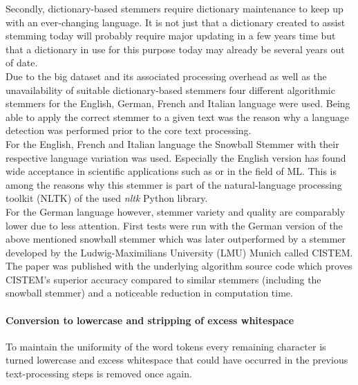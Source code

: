 Secondly, dictionary-based stemmers require dictionary maintenance to keep up with an ever-changing language. It is not just that a dictionary created to assist stemming today will probably require major updating in a few years time but that a dictionary in use for this purpose today may already be several years out of date.\\
Due to the big dataset and its associated processing overhead as well as the unavailability of suitable dictionary-based stemmers four different algorithmic stemmers for the English, German, French and Italian language were used. Being able to apply the correct stemmer to a given text was the reason why a language detection was performed prior to the core text processing.\\
For the English, French and Italian language the Snowball Stemmer \parencite{Porter2001} with their respective language variation was used. Especially the English version has found wide acceptance in scientific applications such as \textcite{Krauthammer2011} or \textcite{Joulin2016} in the field of ML. This is among the reasons why this stemmer is part of the natural-language processing toolkit (NLTK) \parencite{Manning2014} of the used \textit{nltk} Python library.\\
For the German language however, stemmer variety and quality are comparably lower due to less attention. First tests were run with the German version of the above mentioned snowball stemmer which was later outperformed by a stemmer developed by the Ludwig-Maximilians University (LMU) Munich called CISTEM. The paper \textcite{Weissweiler2018} was published with the underlying algorithm source code which proves CISTEM's superior accuracy compared to similar stemmers (including the snowball stemmer) and a noticeable reduction in computation time.

\paragraph*{Conversion to lowercase and stripping of excess whitespace}
To maintain the uniformity of the word tokens every remaining character is turned lowercase and excess whitespace that could have occurred in the previous text-processing steps is removed once again.


